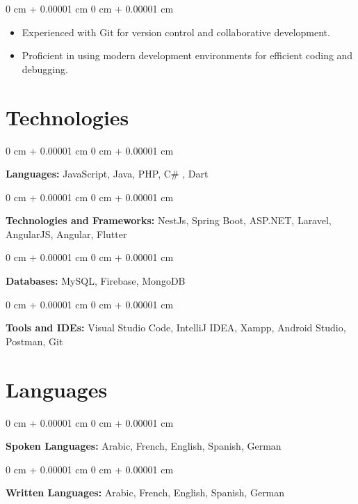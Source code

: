 \documentclass[10pt, letterpaper]{article}
\newenvironment{highlights}{
    \begin{itemize}[
        topsep=0.10 cm,
        parsep=0.10 cm,
        partopsep=0pt,
        itemsep=0pt,
        leftmargin=0 cm + 10pt
    ]
}{
    \end{itemize}
} %
\newenvironment{onecolentry}{
    \begin{adjustwidth}{
        0 cm + 0.00001 cm
    }{
        0 cm + 0.00001 cm
    }
}{
    \end{adjustwidth}
} %
\begin{document}
                \vspace{0.10 cm}
                \begin{onecolentry}
                    \begin{highlights}
                        \item Experienced with Git for version control and collaborative development.
                        \item Proficient in using modern development environments for efficient coding and debugging.
                    \end{highlights}
            \end{onecolentry}
            
        
        
        
        \section{Technologies}

            \begin{onecolentry}
                \textbf{Languages:} JavaScript, Java, PHP, C# ,  Dart \end{onecolentry}
            
            \vspace{0.2 cm}
            
            \begin{onecolentry}
                \textbf{Technologies and Frameworks:} NestJs, Spring Boot, ASP.NET, Laravel, AngularJS, Angular, Flutter \end{onecolentry}
            
            \vspace{0.2 cm}
            
            \begin{onecolentry}
                \textbf{Databases:} MySQL, Firebase, MongoDB \end{onecolentry}
            
            \vspace{0.2 cm}
            
            \begin{onecolentry}
                \textbf{Tools and IDEs:} Visual Studio Code, IntelliJ IDEA, Xampp, Android Studio, Postman, Git \end{onecolentry}


        
        \section{Languages}

\begin{onecolentry}
    \textbf{Spoken Languages:} Arabic, French, English, Spanish, German
\end{onecolentry}

\vspace{0.2 cm}

\begin{onecolentry}
    \textbf{Written Languages:} Arabic, French, English, Spanish, German
\end{onecolentry}
\end{document}
